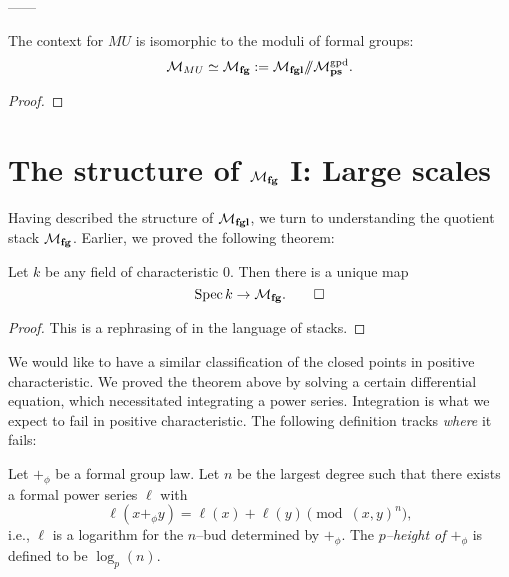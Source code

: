 ------

\begin{corollary}
The context for $MU$ is isomorphic to the moduli of formal groups: \[\mathcal{M}_{MU} \simeq \mathcal{M}_{\mathbf{fg}} := \mathcal{M}_{\mathbf{fgl}} /\!\!/ \mathcal{M}_{\mathbf{ps}}^{\mathrm{gpd}}.\]  
\end{corollary}
\begin{proof}
\end{proof}








\section{The structure of $\mathcal{M}_{\mathbf{fg}}$ I: Large scales}


Having described the structure of $\mathcal{M}_{\mathbf{fgl}}$, we turn to understanding the quotient stack $\mathcal{M}_{\mathbf{fg}}$.  Earlier, we proved the following theorem:

\begin{theorem}
Let $k$ be any field of characteristic $0$.  Then there is a unique map \[\operatorname{Spec} k \to \mathcal{M}_{\mathbf{fg}}. \qed\]
\end{theorem}
\begin{proof}
This is a rephrasing of  in the language of stacks.
\end{proof}

We would like to have a similar classification of the closed points in positive characteristic.  We proved the theorem above by solving a certain differential equation, which necessitated integrating a power series.  Integration is what we expect to fail in positive characteristic.  The following definition tracks \emph{where} it fails:
\begin{definition}
Let $+_\phi$ be a formal group law.  Let $n$ be the largest degree such that there exists a formal power series $\ell$ with \[\ell(x +_\phi y) = \ell(x) + \ell(y) \pmod{(x, y)^{n}},\] i.e., $\ell$ is a logarithm for the $n$--bud determined by $+_\phi$.  The \textit{$p$--height of $+_\phi$} is defined to be $\log_p(n)$.
\end{definition}


